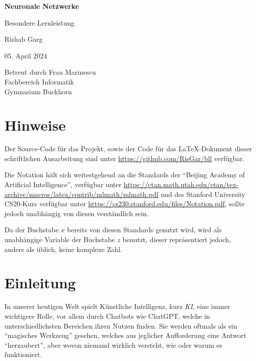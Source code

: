 \documentclass[12pt,titlepage]{article}
\begin{document}
\begin{titlepage}
  \begin{center}
    \vspace*{1cm}

    \Huge
    {\textbf{Neuronale Netzwerke}}

    \LARGE
    Besondere Lernleistung

    \large
    \vspace{1cm}
    Rishab Garg

    \vspace{1cm}
    05. April 2024

    \vfill

    Betreut durch Frau Marinescu\\
    Fachbereich Informatik\\
    Gymnasium Buckhorn\\
  \end{center}
\end{titlepage}

\tableofcontents

\section*{Hinweise}

Der Source-Code für das Projekt, sowie der Code für das {\selectfont\LaTeX}-Dokument dieser schriftlichen Ausarbeitung sind unter \url{https://github.com/RisGar/bll} verfügbar.

Die Notation hält sich weitestgehend an die Standards der \enquote{Beijing Academy of Artificial Intelligence}, verfügbar unter \url{https://ctan.math.utah.edu/ctan/tex-archive/macros/latex/contrib/mlmath/mlmath.pdf} und des Stanford University CS20-Kurs verfügbar unter \url{https://cs230.stanford.edu/files/Notation.pdf}, sollte jedoch unabhängig von diesen verständlich sein.

Da der Buchstabe $x$ bereits von diesen Standards genutzt wird, wird als unabhängige Variable der Buchstabe $z$ benutzt, dieser repräsentiert jedoch, anders als üblich, keine komplexe Zahl.

\section{Einleitung}

In unserer heutigen Welt spielt Künstliche Intelligenz, kurz \textit{KI}, eine immer wichtigere Rolle, vor allem durch Chatbots wie ChatGPT, welche in unterschiedlichsten Bereichen ihren Nutzen finden. Sie werden oftmals als ein \enquote{magisches Werkzeug} gesehen, welches aus jeglicher Aufforderung eine Antwort \enquote{herzaubert}, aber wovon niemand wirklich versteht, wie oder warum es funktioniert.
\end{document}
